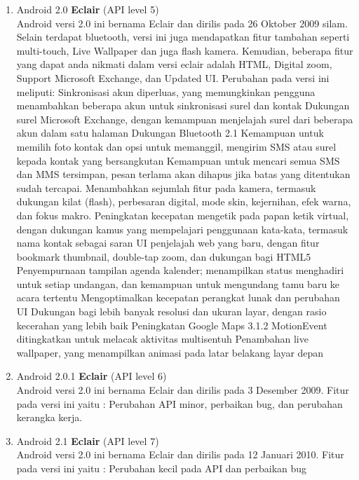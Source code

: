 \begin{enumerate}
\item Android 2.0 \textbf{Eclair} (API level 5)\\
Android versi 2.0 ini bernama Eclair dan dirilis pada 26 Oktober 2009 silam. Selain terdapat bluetooth, versi ini juga mendapatkan fitur tambahan seperti multi-touch, Live Wallpaper dan juga flash kamera. Kemudian, beberapa fitur yang dapat anda nikmati dalam versi eclair adalah HTML, Digital zoom, Support Microsoft Exchange, dan Updated UI. Perubahan pada versi ini meliputi:
Sinkronisasi akun diperluas, yang memungkinkan pengguna menambahkan beberapa akun untuk sinkronisasi surel dan kontak
Dukungan surel Microsoft Exchange, dengan kemampuan menjelajah surel dari beberapa akun dalam satu halaman
Dukungan Bluetooth 2.1
Kemampuan untuk memilih foto kontak dan opsi untuk memanggil, mengirim SMS atau surel kepada kontak yang bersangkutan
Kemampuan untuk mencari semua SMS dan MMS tersimpan, pesan terlama akan dihapus jika batas yang ditentukan sudah tercapai.
Menambahkan sejumlah fitur pada kamera, termasuk dukungan kilat (flash), perbesaran digital, mode skin, kejernihan, efek warna, dan fokus makro.
Peningkatan kecepatan mengetik pada papan ketik virtual, dengan dukungan kamus yang mempelajari penggunaan kata-kata, termasuk nama kontak sebagai saran
UI penjelajah web yang baru, dengan fitur bookmark thumbnail, double-tap zoom, dan dukungan bagi HTML5
Penyempurnaan tampilan agenda kalender; menampilkan status menghadiri untuk setiap undangan, dan kemampuan untuk mengundang tamu baru ke acara tertentu
Mengoptimalkan kecepatan perangkat lunak dan perubahan UI
Dukungan bagi lebih banyak resolusi dan ukuran layar, dengan rasio kecerahan yang lebih baik
Peningkatan Google Maps 3.1.2
MotionEvent ditingkatkan untuk melacak aktivitas multisentuh
Penambahan live wallpaper, yang menampilkan animasi pada latar belakang layar depan


\item Android 2.0.1 \textbf{Eclair} (API level 6)\\
Android versi 2.0 ini bernama Eclair dan dirilis pada 3 Desember 2009. Fitur pada versi ini yaitu : Perubahan API minor, perbaikan bug, dan perubahan kerangka kerja.

\item Android 2.1 \textbf{Eclair} (API level 7)\\
Android versi 2.0 ini bernama Eclair dan dirilis pada 12 Januari 2010. Fitur pada versi ini yaitu : Perubahan kecil pada API dan perbaikan bug


\end{enumerate}
